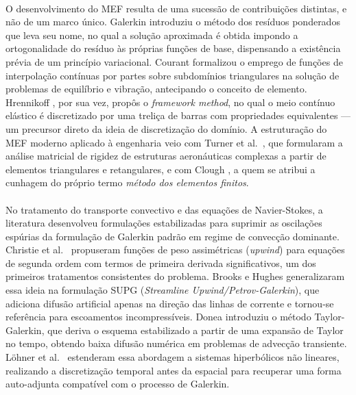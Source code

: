 \paragraph{}O desenvolvimento do MEF resulta de uma sucessão de contribuições distintas, e não de um marco único. Galerkin \cite{Galerkin1915} introduziu o método dos resíduos ponderados que leva seu nome, no qual a solução aproximada é obtida impondo a ortogonalidade do resíduo às próprias funções de base, dispensando a existência prévia de um princípio variacional. Courant \cite{Courant1943} formalizou o emprego de funções de interpolação contínuas por partes sobre subdomínios triangulares na solução de problemas de equilíbrio e vibração, antecipando o conceito de elemento. Hrennikoff \cite{Hrennikoff1941}, por sua vez, propôs o \textit{framework method}, no qual o meio contínuo elástico é discretizado por uma treliça de barras com propriedades equivalentes --- um precursor direto da ideia de discretização do domínio. A estruturação do MEF moderno aplicado à engenharia veio com Turner et al.\ \cite{Turner1956}, que formularam a análise matricial de rigidez de estruturas aeronáuticas complexas a partir de elementos triangulares e retangulares, e com Clough \cite{Clough1960}, a quem se atribui a cunhagem do próprio termo \textit{método dos elementos finitos}.

\paragraph{}No tratamento do transporte convectivo e das equações de Navier-Stokes, a literatura desenvolveu formulações estabilizadas para suprimir as oscilações espúrias da formulação de Galerkin padrão em regime de convecção dominante. Christie et al.\ \cite{Christie1976} propuseram funções de peso assimétricas (\textit{upwind}) para equações de segunda ordem com termos de primeira derivada significativos, um dos primeiros tratamentos consistentes do problema. Brooks e Hughes \cite{Brooks1982} generalizaram essa ideia na formulação SUPG (\textit{Streamline Upwind/Petrov-Galerkin}), que adiciona difusão artificial apenas na direção das linhas de corrente e tornou-se referência para escoamentos incompressíveis. Donea \cite{Donea1984} introduziu o método Taylor-Galerkin, que deriva o esquema estabilizado a partir de uma expansão de Taylor no tempo, obtendo baixa difusão numérica em problemas de advecção transiente. Löhner et al.\ \cite{Lohner1984} estenderam essa abordagem a sistemas hiperbólicos não lineares, realizando a discretização temporal antes da espacial para recuperar uma forma auto-adjunta compatível com o processo de Galerkin.

